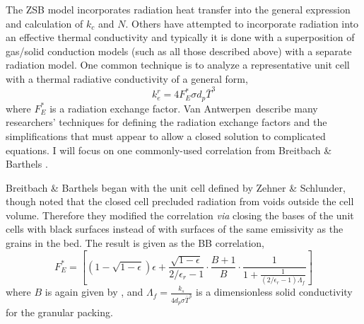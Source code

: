 The ZSB model incorporates radiation heat transfer into the general expression and calculation of $k_c$ and $N$. Others have attempted to incorporate radiation into an effective thermal conductivity and typically it is done with a superposition of gas/solid conduction models (such as all those described above) with a separate radiation model. One common technique is to analyze a representative unit cell with a thermal radiative conductivity of a general form,
\begin{equation}
     k_e^r = 4 F_E^*\sigma d_p \bar{T}^3
\end{equation} 
where $F_E^*$ is a radiation exchange factor. Van Antwerpen\etal~describe many researchers' techniques for defining the radiation exchange factors and the simplifications that must appear to allow a closed solution to complicated equations. I will focus on one commonly-used correlation from Breitbach \& Barthels \cite{breitbach1980radiant}.

Breitbach \& Barthels began with the unit cell defined by Zehner \& Schlunder, though noted that the closed cell precluded radiation from voids outside the cell volume. Therefore they modified the correlation \textit{via} closing the bases of the unit cells with black surfaces instead of with surfaces of the same emissivity as the grains in the bed. The result is given as the BB correlation,\cite{breitbach1980radiant}
\begin{equation}
    F_E^* = \left[\left(1-\sqrt{1-\epsilon}\right)\epsilon + \frac{\sqrt{1-\epsilon}}{2/\epsilon_r - 1}\cdot\frac{B+1}{B}\cdot\frac{1}{1+\frac{1}{(2/\epsilon_r - 1)\Lambda_f}} \right]
\end{equation}
where $B$ is again given by , and $\Lambda_f = \frac{k_s}{4d_p\sigma\bar{T}^3}$ is a dimensionless solid conductivity for the granular packing.


